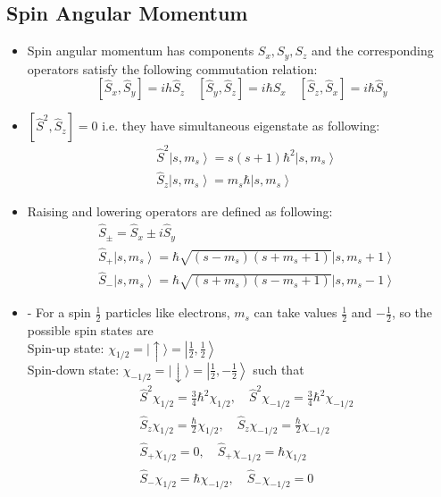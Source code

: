  \subsection{ Spin Angular Momentum}
 \begin{itemize}
 	\item Spin angular momentum has components $S_x,S_y,S_z$ and the corresponding operators satisfy the following commutation relation:
 	$$
 	\left[\hat{S}_{x}, \hat{S}_{y}\right]=i h \hat{S}_{z} \quad\left[\hat{S}_{y}, \hat{S}_{z}\right]=i \hbar \hat{S}_{x} \quad\left[\hat{S}_{z}, \hat{S}_{x}\right]=i \hbar \hat{S}_{y}
 	$$
 	\item $\left[\hat{S}^{2}, \hat{S}_{z}\right]=0$ i.e. they have simultaneous eigenstate as following:
 	$$
 	\begin{aligned}
 	&\hat{S}^{2}\left|s, m_{s}\right\rangle=s(s+1) \hbar^{2}\left|s, m_{s}\right\rangle \\
 	&\hat{S}_{z}\left|s, m_{s}\right\rangle=m_{s} \hbar\left|s, m_{s}\right\rangle
 	\end{aligned}
 	$$
 	\item Raising and lowering operators are defined as following:
 	$$
 	\begin{aligned}
 	&\hat{S}_{\pm}=\hat{S}_{x} \pm i \hat{S}_{y} \\
 	&\hat{S}_{+}\left|s, m_{s}\right\rangle=\hbar \sqrt{\left(s-m_{s}\right)\left(s+m_{s}+1\right)}\left|s, m_{s}+1\right\rangle \\
 	&\hat{S}_{-}\left|s, m_{s}\right\rangle=\hbar \sqrt{\left(s+m_{s}\right)\left(s-m_{s}+1\right)}\left|s, m_{s}-1\right\rangle
 	\end{aligned}
 	$$
 	\item - For a spin $\frac{1}{2}$ particles like electrons, $m_{s}$ can take values $\frac{1}{2}$ and $-\frac{1}{2}$, so the possible spin states are\\
 	Spin-up state: $\chi_{1 / 2}=|\uparrow\rangle=\left|\frac{1}{2}, \frac{1}{2}\right\rangle$\\
 	Spin-down state: $\chi_{-1 / 2}=|\downarrow\rangle=\left|\frac{1}{2},-\frac{1}{2}\right\rangle$
 	such that
 	$$\begin{aligned}
 		&\hat{S}^{2} \chi_{1 / 2}=\frac{3}{4} \hbar^{2} \chi_{1 / 2}, \quad \hat{S}^{2} \chi_{-1 / 2}=\frac{3}{4} \hbar^{2} \chi_{-1 / 2} \\
 		&\hat{S}_{z} \chi_{1 / 2}=\frac{\hbar}{2} \chi_{1 / 2}, \quad \hat{S}_{z} \chi_{-1 / 2}=\frac{\hbar}{2} \chi_{-1 / 2} \\
 		&\hat{S}_{+} \chi_{1 / 2}=0, \quad \hat{S}_{+} \chi_{-1 / 2}=\hbar \chi_{1 / 2} \\
 		&\hat{S}_{-} \chi_{1 / 2}=\hbar \chi_{-1 / 2}, \quad \hat{S}_{-} \chi_{-1 / 2}=0
 	\end{aligned}$$
 \end{itemize}
